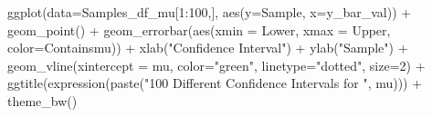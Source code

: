 \documentclass[
  letterpaper,
  DIV=11,
  numbers=noendperiod]{scrreprt}
\newenvironment{Shaded}{\begin{snugshade}}{\end{snugshade}}
\newcommand{\AttributeTok}[1]{\textcolor[rgb]{0.40,0.45,0.13}{#1}}
\newcommand{\DecValTok}[1]{\textcolor[rgb]{0.68,0.00,0.00}{#1}}
\newcommand{\FunctionTok}[1]{\textcolor[rgb]{0.28,0.35,0.67}{#1}}
\newcommand{\NormalTok}[1]{\textcolor[rgb]{0.00,0.23,0.31}{#1}}
\newcommand{\SpecialCharTok}[1]{\textcolor[rgb]{0.37,0.37,0.37}{#1}}
\newcommand{\StringTok}[1]{\textcolor[rgb]{0.13,0.47,0.30}{#1}}
\begin{document}
\begin{Shaded}
\begin{Highlighting}[]
\FunctionTok{ggplot}\NormalTok{(}\AttributeTok{data=}\NormalTok{Samples\_df\_mu[}\DecValTok{1}\SpecialCharTok{:}\DecValTok{100}\NormalTok{,], }\FunctionTok{aes}\NormalTok{(}\AttributeTok{y=}\NormalTok{Sample, }\AttributeTok{x=}\NormalTok{y\_bar\_val)) }\SpecialCharTok{+}    
  \FunctionTok{geom\_point}\NormalTok{() }\SpecialCharTok{+}
  \FunctionTok{geom\_errorbar}\NormalTok{(}\FunctionTok{aes}\NormalTok{(}\AttributeTok{xmin =}\NormalTok{ Lower, }\AttributeTok{xmax =}\NormalTok{ Upper, }\AttributeTok{color=}\NormalTok{Containsmu))  }\SpecialCharTok{+} 
  \FunctionTok{xlab}\NormalTok{(}\StringTok{"Confidence Interval"}\NormalTok{) }\SpecialCharTok{+} 
  \FunctionTok{ylab}\NormalTok{(}\StringTok{"Sample"}\NormalTok{) }\SpecialCharTok{+} 
  \FunctionTok{geom\_vline}\NormalTok{(}\AttributeTok{xintercept =}\NormalTok{ mu, }\AttributeTok{color=}\StringTok{"green"}\NormalTok{, }\AttributeTok{linetype=}\StringTok{"dotted"}\NormalTok{, }\AttributeTok{size=}\DecValTok{2}\NormalTok{) }\SpecialCharTok{+} 
  \FunctionTok{ggtitle}\NormalTok{(}\FunctionTok{expression}\NormalTok{(}\FunctionTok{paste}\NormalTok{(}\StringTok{"100 Different Confidence Intervals for "}\NormalTok{, mu))) }\SpecialCharTok{+} 
  \FunctionTok{theme\_bw}\NormalTok{() }
\end{Highlighting}
\end{Shaded}
\end{document}
